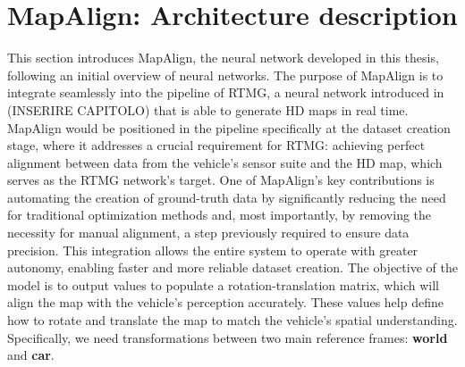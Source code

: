 \section{MapAlign: Architecture description}
This section introduces MapAlign, the neural network developed in this thesis, following an initial overview of neural networks. The purpose of MapAlign is to integrate seamlessly into the pipeline of RTMG, a neural network introduced in (INSERIRE CAPITOLO) that is able to generate HD maps in real time. 
MapAlign would be positioned in the pipeline specifically at the dataset creation stage, where it addresses a crucial requirement for RTMG: achieving perfect alignment between data from the vehicle's sensor suite and the HD map, which serves as the RTMG network’s target.
One of MapAlign’s key contributions is automating the creation of ground-truth data by significantly reducing the need for traditional optimization methods and, most importantly, by removing the necessity for manual alignment, a step previously required to ensure data precision. This integration allows the entire system to operate with greater autonomy, enabling faster and more reliable dataset creation. 
The objective of the model is to output values to populate a rotation-translation matrix, which will align the map with the vehicle’s perception accurately. These values help define how to rotate and translate the map to match the vehicle's spatial understanding. Specifically, we need transformations between two main reference frames: \textbf{world} and \textbf{car}.
